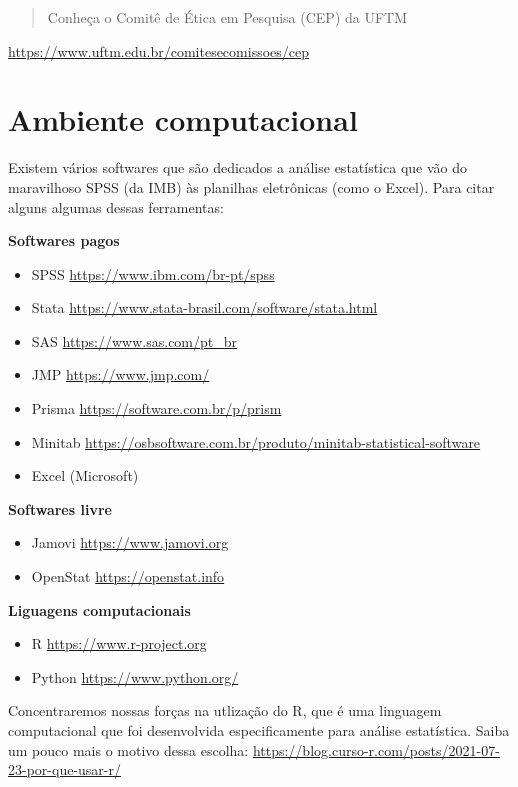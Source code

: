 \documentclass[
]{book}
\begin{document}
\begin{quote}
Conheça o Comitê de Ética em Pesquisa (CEP) da UFTM
\end{quote}

\url{https://www.uftm.edu.br/comitesecomissoes/cep}

\hypertarget{ambiente-computacional}{%
\chapter{Ambiente computacional}\label{ambiente-computacional}}

Existem vários softwares que são dedicados a análise estatística que vão do maravilhoso SPSS (da IMB) às planilhas eletrônicas (como o Excel). Para citar alguns algumas dessas ferramentas:

\textbf{Softwares pagos}

\begin{itemize}
\item
  SPSS \url{https://www.ibm.com/br-pt/spss}
\item
  Stata \url{https://www.stata-brasil.com/software/stata.html}
\item
  SAS \url{https://www.sas.com/pt_br}
\item
  JMP \url{https://www.jmp.com/}
\item
  Prisma \url{https://software.com.br/p/prism}
\item
  Minitab \url{https://osbsoftware.com.br/produto/minitab-statistical-software}
\item
  Excel (Microsoft)
\end{itemize}

\textbf{Softwares livre}

\begin{itemize}
\item
  Jamovi \url{https://www.jamovi.org}
\item
  OpenStat \url{https://openstat.info}
\end{itemize}

\textbf{Liguagens computacionais}

\begin{itemize}
\item
  R \url{https://www.r-project.org}
\item
  Python \url{https://www.python.org/}
\end{itemize}

Concentraremos nossas forças na utlização do R, que é uma linguagem computacional que foi desenvolvida especificamente para análise estatística. Saiba um pouco mais o motivo dessa escolha: \url{https://blog.curso-r.com/posts/2021-07-23-por-que-usar-r/}
\end{document}
